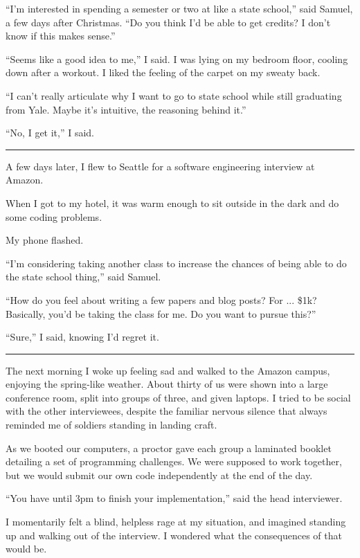 ``I'm interested in spending a semester or two at like a state school,'' said
Samuel, a few days after Christmas.  ``Do you think I'd be able to get credits?
I don't know if this makes sense.''

``Seems like a good idea to me,'' I said.  I was lying on my bedroom floor,
cooling down after a workout.  I liked the feeling of the carpet on my 
sweaty back. 

``I can't really articulate why I want to go to state school while still
graduating from Yale.   Maybe it's intuitive, the reasoning behind it.'' 

``No, I get it,'' I said. 

\plainfancybreak{12pt}{2}{* * *}

A few days later, I flew to Seattle for a software engineering interview at
Amazon.

When I got to my hotel, it was warm enough to sit outside in the dark and do
some coding problems.

My phone flashed.

``I'm considering taking another class to increase the chances of being able to
do the state school thing,'' said Samuel.  

``How do you feel about writing a few papers and blog posts?  For ... \$1k?
Basically, you'd be taking the class for me.  Do you want to pursue this?'' 

``Sure,'' I said, knowing I'd regret it.

\plainfancybreak{12pt}{2}{* * *}

The next morning I woke up feeling sad and walked to the Amazon campus, enjoying
the spring-like weather.  About thirty of us were shown into a large conference
room, split into groups of three, and given laptops.  I tried to be social with
the other interviewees, despite the familiar nervous silence that always
reminded me of soldiers standing in landing craft.

As we booted our computers, a proctor gave each group a laminated booklet
detailing a set of programming challenges.  We were supposed to work together,
but we would submit our own code independently at the end of the day.

``You have until 3pm to finish your implementation,'' said the head interviewer.

I momentarily felt a blind, helpless rage at my situation, and imagined standing
up and walking out of the interview.  I wondered what the consequences of that
would be.  

